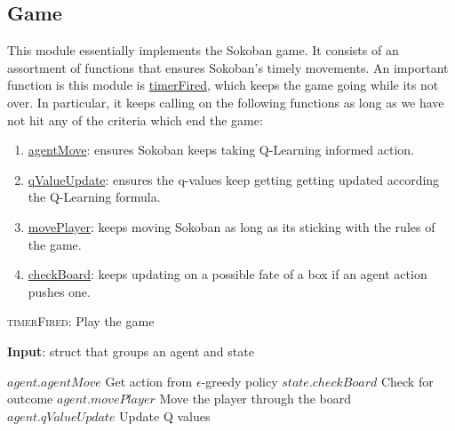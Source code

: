 \documentclass{article}
\begin{document}
\subsection{Game}
This module essentially implements the Sokoban game. It consists of an assortment of functions that ensures Sokoban's timely movements. An important function is this module is \underline{timerFired}, which keeps the game going while its not over. In particular, it keeps calling on the following functions as long as we have not hit any of the criteria which end the game: 

\begin{enumerate}[label=\alph*)]
    \item \underline{agentMove}: ensures Sokoban keeps taking Q-Learning informed action.
    \item \underline{qValueUpdate}: ensures the q-values keep getting getting updated according the Q-Learning formula. 
    \item \underline{movePlayer}: keeps moving Sokoban as long as its sticking with the rules of the game.
    \item \underline{checkBoard}: keeps updating on a possible fate of a box if an agent action pushes one.
\end{enumerate}

\begin{algorithm}
    \caption{\textsc{timerFired}: Play the game}\label{euclid}
    \hspace*{\algorithmicindent} \textbf{Input}: struct that groups an agent and state \\
    \begin{algorithmic}
        \State $agent.agentMove$ Get action from $\epsilon$-greedy policy
        \State $state.checkBoard$ Check for outcome
        \State $agent.movePlayer$ Move the player through the board
        \State $agent.qValueUpdate$ Update Q values
    \EndIf 
    \end{algorithmic}
\end{algorithm}
\end{document}
